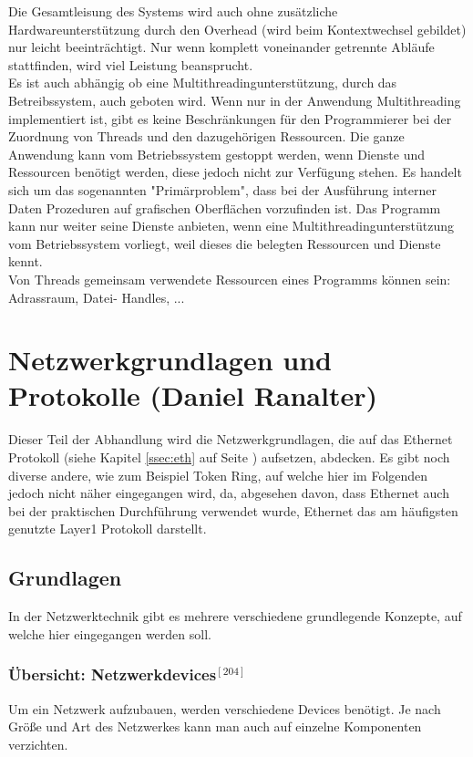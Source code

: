 \documentclass[12pt,a4paper]{report}
\begin{document}
\begin{onehalfspace}
Die Gesamtleisung des Systems wird auch ohne zusätzliche Hardwareunterstützung durch den Overhead (wird beim Kontextwechsel gebildet) nur leicht beeinträchtigt. Nur wenn komplett voneinander getrennte Abläufe stattfinden, wird viel Leistung beansprucht.\\

Es ist auch abhängig ob eine Multithreadingunterstützung, durch das Betreibssystem, auch geboten wird. Wenn nur in der Anwendung Multithreading implementiert ist, gibt es keine Beschränkungen für den Programmierer bei der Zuordnung von Threads und den dazugehörigen Ressourcen. Die ganze Anwendung kann vom Betriebssystem gestoppt werden, wenn Dienste und Ressourcen benötigt werden, diese jedoch nicht zur Verfügung stehen. Es handelt sich um das sogenannten "{}Primärproblem"{}, dass bei der Ausführung interner Daten Prozeduren auf grafischen Oberflächen vorzufinden ist. Das Programm kann nur weiter seine Dienste anbieten, wenn eine Multithreadingunterstützung vom Betriebssystem vorliegt, weil dieses die belegten Ressourcen und Dienste kennt.\\

Von Threads gemeinsam verwendete Ressourcen eines Programms können sein: Adrassraum, Datei- Handles, 
...\\

\newpage
{}
\chapter{Netzwerkgrundlagen und Protokolle (Daniel Ranalter)}
Dieser Teil der Abhandlung wird die Netzwerkgrundlagen, die auf das Ethernet Protokoll (siehe Kapitel \ref{ssec:eth} auf Seite \pageref{ssec:eth}) aufsetzen, abdecken. Es gibt noch diverse andere, wie zum Beispiel Token Ring, auf welche hier im Folgenden jedoch nicht näher eingegangen wird, da, abgesehen davon, dass Ethernet auch bei der praktischen Durchführung verwendet wurde, Ethernet das am häufigsten genutzte Layer1 Protokoll darstellt. 

\section{Grundlagen}
In der Netzwerktechnik gibt es mehrere verschiedene grundlegende Konzepte, auf welche hier eingegangen werden soll.

\subsection{Übersicht: Netzwerkdevices$^{[204]}$}
Um ein Netzwerk aufzubauen, werden verschiedene Devices benötigt. Je nach Größe und Art des Netzwerkes kann man auch auf einzelne Komponenten verzichten. 


\end{onehalfspace}
\end{document}
